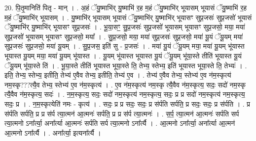 \documentclass[17pt]{extarticle}
\begin{document}
20. पि॒तृ॒मानिति॑ पितृ - मान् । . अ॒हं ॅयु॒ष्माभि॑र् यु॒ष्माभि॑ र॒ह म॒हं ॅयु॒ष्माभि॑र् भूयासम् भूयासं ॅयु॒ष्माभि॑ र॒ह म॒हं ॅयु॒ष्माभि॑र् भूयासम् । . यु॒ष्माभि॑र् भूयासम् भूयासं ॅयु॒ष्माभि॑र् यु॒ष्माभि॑र् भूयासꣳ सुप्र॒जसः॑ सुप्र॒जसो॑ भूयासं ॅयु॒ष्माभि॑र् यु॒ष्माभि॑र् भूयासꣳ सुप्र॒जसः॑ । . भू॒या॒सꣳ॒॒ सु॒प्र॒जसः॑ सुप्र॒जसो॑ भूयासम् भूयासꣳ सुप्र॒जसो॒ मया॒ मया॑ सुप्र॒जसो॑ भूयासम् भूयासꣳ सुप्र॒जसो॒ मया᳚ । . सु॒प्र॒जसो॒ मया॒ मया॑ सुप्र॒जसः॑ सुप्र॒जसो॒ मया॑ यू॒यं ॅयू॒यम् मया॑ सुप्र॒जसः॑ सुप्र॒जसो॒ मया॑ यू॒यम् । . सु॒प्र॒जस॒ इति॑ सु - प्र॒जसः॑ । . मया॑ यू॒यं ॅयू॒यम् मया॒ मया॑ यू॒यम् भू॑यास्त भूयास्त यू॒यम् मया॒ मया॑ यू॒यम् भू॑यास्त । . यू॒यम् भू॑यास्त भूयास्त यू॒यं ॅयू॒यम् भू॑या॒स्ते तीति॑ भूयास्त यू॒यं ॅयू॒यम् भू॑या॒स्ते ति॑ । . भू॒या॒स्ते तीति॑ भूयास्त भूया॒स्ते ति॒ तेभ्य॒ स्तेभ्य॒ इति॑ भूयास्त भूया॒स्ते ति॒ तेभ्यः॑ । . इति॒ तेभ्य॒ स्तेभ्य॒ इतीति॒ तेभ्य॑ ए॒वैव तेभ्य॒ इतीति॒ तेभ्य॑ ए॒व । . तेभ्य॑ ए॒वैव तेभ्य॒ स्तेभ्य॑ ए॒व न॑म॒स्कृत्य॑ नम॒स्कृ???त्यै॒व तेभ्य॒ स्तेभ्य॑ ए॒व न॑म॒स्कृत्य॑ । . ए॒व न॑म॒स्कृत्य॑ नम॒स्कृ त्यै॒वैव न॑म॒स्कृत्य॒ सदः॒ सदो॑ नम॒स्कृ त्यै॒वैव न॑म॒स्कृत्य॒ सदः॑ । . न॒म॒स्कृत्य॒ सदः॒ सदो॑ नम॒स्कृत्य॑ नम॒स्कृत्य॒ सदः॒ प्र प्र सदो॑ नम॒स्कृत्य॑ नम॒स्कृत्य॒ सदः॒ प्र । . न॒म॒स्कृत्येति॑ नमः - कृत्य॑ । . सदः॒ प्र प्र सदः॒ सदः॒ प्र स॑र्पति सर्पति॒ प्र सदः॒ सदः॒ प्र स॑र्पति । . प्र स॑र्पति सर्पति॒ प्र प्र स॑र्प त्या॒त्मन॑ आ॒त्मनः॑ सर्पति॒ प्र प्र स॑र्प त्या॒त्मनः॑ । . स॒र्प॒ त्या॒त्मन॑ आ॒त्मनः॑ सर्पति सर्प त्या॒त्मनो ऽना᳚र्त्या॒ अना᳚र्त्या आ॒त्मनः॑ सर्पति सर्प त्या॒त्मनो ऽना᳚र्त्यै । . आ॒त्मनो ऽना᳚र्त्या॒ अना᳚र्त्या आ॒त्मन॑ आ॒त्मनो ऽना᳚र्त्यै । . अना᳚र्त्या॒ इत्यना᳚र्त्यै । \newline
\pagebreak
{}
\end{document}
